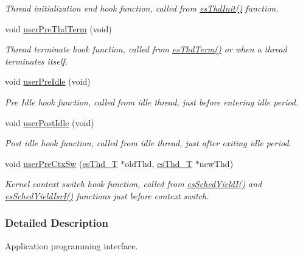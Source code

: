 \begin{DoxyCompactItemize}
\begin{DoxyCompactList}\small\item\em Thread initialization end hook function, called from \hyperlink{group__kern__intf_gac91734f3ee867b519f59bf81cc7fde88}{es\-Thd\-Init()} function. \end{DoxyCompactList}\item 
void \hyperlink{group__kern__intf_ga076ad76633999c9d5e245e3b5c6e0c09}{user\-Pre\-Thd\-Term} (void)
\begin{DoxyCompactList}\small\item\em Thread terminate hook function, called from \hyperlink{group__kern__intf_gac9d1eac76f26096614e8196bcfd8b905}{es\-Thd\-Term()} or when a thread terminates itself. \end{DoxyCompactList}\item 
void \hyperlink{group__kern__intf_ga2bd40d82f768787c3dab2f4df336685e}{user\-Pre\-Idle} (void)
\begin{DoxyCompactList}\small\item\em Pre Idle hook function, called from idle thread, just before entering idle period. \end{DoxyCompactList}\item 
void \hyperlink{group__kern__intf_ga7ca4a96cbe5064d633298d1d172fd4e7}{user\-Post\-Idle} (void)
\begin{DoxyCompactList}\small\item\em Post idle hook function, called from idle thread, just after exiting idle period. \end{DoxyCompactList}\item 
void \hyperlink{group__kern__intf_ga74a38c965110d0f2f2e44e13571fe3fc}{user\-Pre\-Ctx\-Sw} (\hyperlink{group__kern__intf_ga62e3a3ca0a4597a19c43cb8868810d82}{es\-Thd\-\_\-\-T} $\ast$old\-Thd, \hyperlink{group__kern__intf_ga62e3a3ca0a4597a19c43cb8868810d82}{es\-Thd\-\_\-\-T} $\ast$new\-Thd)
\begin{DoxyCompactList}\small\item\em Kernel context switch hook function, called from \hyperlink{group__kern__intf_gaf90e487bfce974dafaeed5009e189810}{es\-Sched\-Yield\-I()} and \hyperlink{group__kern__intf_gafbea29b376b29f11bbfc48a0f5144e9a}{es\-Sched\-Yield\-Isr\-I()} functions just before context switch. \end{DoxyCompactList}\end{DoxyCompactItemize}


\subsubsection{Detailed Description}
Application programming interface. 


